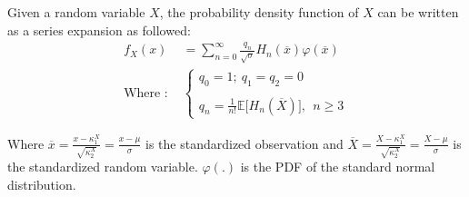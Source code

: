 \begin{definition}
    Given a random variable $X$, the probability density function of $X$ can be written as a series expansion as followed:
    \begin{align*}
        f_X(x) &= \sum_{n=0}^\infty \frac{q_n}{\sqrt{\sigma}}H_n(\overline{x})\varphi(\overline{x}) \\
        \text{Where : }&
        \begin{cases}
            q_0 = 1; \ q_1 = q_2 = 0
            \\ \\
            q_n = \frac{1}{n!}\mathbb{E}\Big[H_n(\overline{X}) \Big], \ \ n\ge3
        \end{cases}
    \end{align*}

    \noindent\newline Where $\overline{x}=\frac{x - \kappa_1^X}{\sqrt{\kappa_2^X}} = \frac{x - \mu}{\sigma}$ is the standardized observation and $\overline{X}=\frac{X - \kappa_1^X}{\sqrt{\kappa_2^X}} = \frac{X - \mu}{\sigma}$ is the standardized random variable. $\varphi(.)$ is the PDF of the standard normal distribution.
\end{definition}